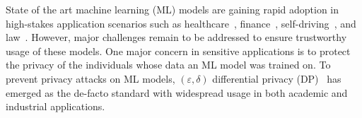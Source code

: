 
State of the art machine learning (ML) models are gaining rapid adoption in high-stakes application scenarios such as healthcare~\citep{challen2019artificial, mozannar2020consistent}, finance~\citep{vijh2020stock}, self-driving~\citep{ghodsi2021generating}, and law~\citep{vieira2021understanding}. However, major challenges remain to be addressed to ensure trustworthy usage of these models. One major concern in sensitive applications is to protect the privacy of the individuals whose data an ML model was trained on. %
To prevent privacy attacks on ML models, $(\varepsilon, \delta)$ differential privacy (DP)~\citep{dwork2014algorithmic} has emerged as the de-facto standard with widespread usage in both academic and industrial applications. %


